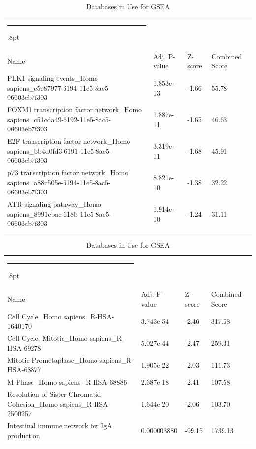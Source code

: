 \documentclass[3p,authoryear,preprint,12pt]{elsarticle}
\makeatletter
\def\hlinewd#1{%
  \noalign{\ifnum0=`}\fi\hrule \@height #1%
  \futurelet\reserved@a\@xhline}
\def\tbltoprule{\hlinewd{.8pt}\\[-12pt]}
\def\tblbottomrule{\noalign{\vspace*{6pt}}\hline\noalign{\vspace*{2pt}}}
\def\tblmidrule{\noalign{\vspace*{6pt}}\hline\noalign{\vspace*{2pt}}}
\makeatother
\begin{document}
\begin{table}[!htbp]
	\caption{{Databases in Use for GSEA} }
	\label{tw-de478ae31cc6}
	\def\arraystretch{1}
	\ignorespaces 
	\centering 
	\begin{tabulary}{\linewidth}{p{\dimexpr.65\tabcolsep}p{\dimexpr.15\tabcolsep}p{\dimexpr.1\tabcolsep}p{\dimexpr.1\tabcolsep}}
		\tbltoprule Name & Adj. P-value & Z-score & Combined Score\\
		\tblmidrule
PLK1 signaling events\_Homo sapiens\_e5e87977-6194-11e5-8ac5-06603eb7f303 & 1.853e-13 & -1.66 & 55.78 \\
FOXM1 transcription factor network\_Homo sapiens\_c51cda49-6192-11e5-8ac5-06603eb7f303 & 1.887e-11 & -1.65 & 46.63 \\
E2F transcription factor network\_Homo sapiens\_bb4d0fd3-6191-11e5-8ac5-06603eb7f303 & 3.319e-11 & -1.68 & 45.91 \\
p73 transcription factor network\_Homo sapiens\_a88c505e-6194-11e5-8ac5-06603eb7f303 & 8.821e-10 & -1.38 & 32.22 \\
ATR signaling pathway\_Homo sapiens\_8991cbac-618b-11e5-8ac5-06603eb7f303 & 1.914e-10 & -1.24 & 31.11 \\
		\tblbottomrule
	\end{tabulary}\par 
\end{table}
\begin{table}[!htbp]
	\caption{{Databases in Use for GSEA} }
	\label{tw-de478ae31cc6}
	\def\arraystretch{1}
	\ignorespaces 
	\centering 
	\begin{tabulary}{\linewidth}{p{\dimexpr.65\tabcolsep}p{\dimexpr.15\tabcolsep}p{\dimexpr.1\tabcolsep}p{\dimexpr.1\tabcolsep}}
		\tbltoprule Name & Adj. P-value & Z-score & Combined Score\\
		\tblmidrule
Cell Cycle\_Homo sapiens\_R-HSA-1640170 & 3.743e-54 & -2.46 & 317.68 \\
Cell Cycle, Mitotic\_Homo sapiens\_R-HSA-69278 & 5.027e-44 & -2.47 & 259.31 \\
Mitotic Prometaphase\_Homo sapiens\_R-HSA-68877 & 1.905e-22 & -2.03 & 111.73 \\
M Phase\_Homo sapiens\_R-HSA-68886 & 2.687e-18 & -2.41 & 107.58 \\
Resolution of Sister Chromatid Cohesion\_Homo sapiens\_R-HSA-2500257 & 1.644e-20 & -2.06 & 103.70 \\
Intestinal immune network for IgA production & 0.000003880 & -99.15 & 1739.13 \\
		\tblbottomrule
	\end{tabulary}\par 
\end{table}
\end{document}
